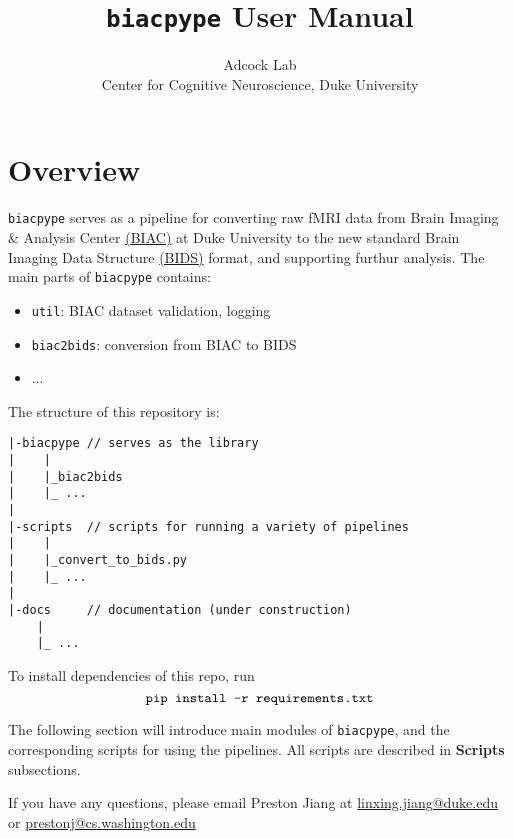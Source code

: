 \documentclass[12pt]{myland}
\def\<#1>{\texttt{#1}}
\begin{document}
\title{\texttt{biacpype} User Manual}
\author{\small{Adcock Lab} \\ \small{Center for Cognitive Neuroscience, Duke University}}
\maketitle
\tableofcontents
\newpage

\section{Overview}

    \texttt{biacpype} serves as a pipeline for converting raw fMRI data from Brain Imaging \& Analysis Center
    \href{https://www.biac.duke.edu/}{(BIAC)} at Duke University to the new standard Brain Imaging Data Structure
    \href{http://bids.neuroimaging.io/}{(BIDS)} format, and supporting furthur analysis. The main parts of
    \texttt{biacpype} contains:

    \begin{itemize}
        \item \texttt{util}: BIAC dataset validation, logging 
        \item \texttt{biac2bids}: conversion from BIAC to BIDS
        \item ...
    \end{itemize}

    The structure of this repository is: \par \vspace{.2in}

    \begin{lstlisting}
|-biacpype // serves as the library
|    |
|    |_biac2bids
|    |_ ...
|
|-scripts  // scripts for running a variety of pipelines
|    |
|    |_convert_to_bids.py
|    |_ ...
|
|-docs     // documentation (under construction)
    |
    |_ ...
    \end{lstlisting}

    To install dependencies of this repo, run
    \[\text{\<pip install -r requirements.txt>}\]

    The following section will introduce main modules of \texttt{biacpype}, and the corresponding scripts for using
    the pipelines. All scripts are described in \textbf{Scripts} subsections.

    If you have any questions, please email Preston Jiang at \href{mailto:linxing.jiang@duke.edu}{linxing.jiang@duke.edu}
    or \href{mailto:prestonj@cs.washington.edu}{prestonj@cs.washington.edu}  \par
\end{document}
